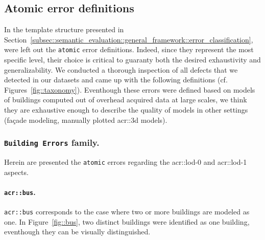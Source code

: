     \subsection{Atomic error definitions}
        \label{subsec::semantic_evaluation::overhead::atomic}
        In the template structure presented in Section~\ref{subsec::semantic_evaluation::general_framework::error_classification}, were left out the \texttt{atomic} error definitions.
        Indeed, since they represent the most specific level, their choice is critical to guaranty both the desired exhaustivity and generalizability.
        We conducted a thorough inspection of all defects that we detected in our datasets and came up with the following definitions (cf. Figures~\ref{fig::taxonomy}).
        Eventhough these errors were defined based on models of buildings computed out of overhead acquired data at large scales, we think they are exhaustive enough to describe the quality of models in other settings (fa\c{c}ade modeling, manually plotted \gls{acr::3d} models).

        \subsubsection{\texttt{Building Errors} family.}
            Herein are presented the \texttt{atomic} errors regarding the \gls{acr::lod}-0 and \gls{acr::lod}-1 aspects.

            \paragraph{\texttt{\acrlong*{acr::bus}}.}
                \texttt{\gls{acr::bus}} corresponds to the case where two or more buildings are modeled as one.
                In Figure~\ref{fig::bus}, two distinct buildings were identified as one building, eventhough they can be visually distinguished.\\

